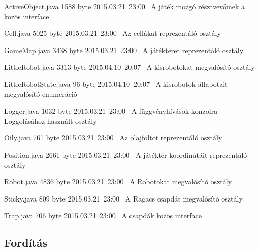 \begin{fajllista}

\begin{fajllista}

\fajl
{ActiveObject.java} %
{1588 byte} %
{2015.03.21~23:00~} %
{A játék mozgó résztvevőinek a közös interface} %

\fajl
{Cell.java} %
{5025 byte} %
{2015.03.21~23:00~} %
{Az cellákat reprezentáló osztály} %

\fajl
{GameMap.java} %
{3438 byte} %
{2015.03.21~23:00~} %
{A játékteret reprezentáló osztály} %

\fajl
{LittleRobot.java}
{3313 byte}
{2015.04.10~20:07~}
{A kisrobotokat megvalósító osztály}

\fajl
{LittleRobotState.java}
{96 byte}
{2015.04.10~20:07~}
{A kisrobotok állapotait megvalósító enumeráció}

\fajl
{Logger.java} %
{1032 byte} %
{2015.03.21~23:00~} %
{A függvényhívások konzolra Loggolásához használt osztály} %

\fajl
{Oily.java} %
{761 byte} %
{2015.03.21~23:00~} %
{Az olajfoltot reprezentáló osztály} %

\fajl
{Position.java} %
{2661 byte} %
{2015.03.21~23:00~} %
{A játéktér koordinátáit reprezentáló osztály} %

\fajl
{Robot.java} %
{4836 byte} %
{2015.03.21~23:00~} %
{A Robotokat megvalósító osztály} %

\fajl
{Sticky.java} %
{809 byte} %
{2015.03.21~23:00~} %
{A Ragacs csapdát megvalósító osztály} %

\fajl
{Trap.java} %
{706 byte} %
{2015.03.21~23:00~} %
{A csapdák közös interface} %

\end{fajllista}

\subsection{Fordítás}


\end{fajllista}
